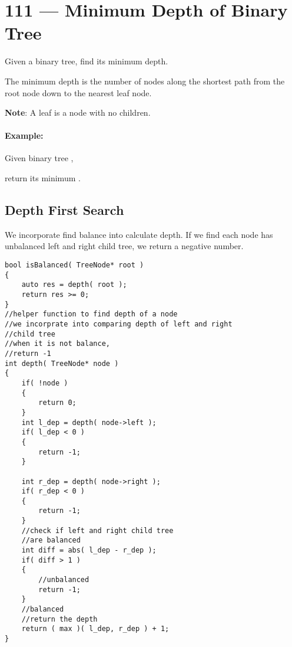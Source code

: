 \section{111 --- Minimum Depth of Binary Tree}
Given a binary tree, find its minimum depth.

The minimum depth is the number of nodes along the shortest path from the root node down to the nearest leaf node.

\textbf{Note}: A leaf is a node with no children.

\paragraph{Example:}
\begin{flushleft}

Given binary tree ,

\begin{figure}[H]

\begin{figure}[H]
\end{figure}

\end{figure}
return its minimum .
\end{flushleft}

\subsection{Depth First Search}
We incorporate find balance into calculate depth. If we find each node has unbalanced left and right child tree, we return a negative number.

\setcounter{lstlisting}{0}
\begin{lstlisting}[style=customc, caption={DFS}]
bool isBalanced( TreeNode* root )
{
    auto res = depth( root );
    return res >= 0;
}
//helper function to find depth of a node
//we incorprate into comparing depth of left and right
//child tree
//when it is not balance,
//return -1
int depth( TreeNode* node )
{
    if( !node )
    {
        return 0;
    }
    int l_dep = depth( node->left );
    if( l_dep < 0 )
    {
        return -1;
    }

    int r_dep = depth( node->right );
    if( r_dep < 0 )
    {
        return -1;
    }
    //check if left and right child tree
    //are balanced
    int diff = abs( l_dep - r_dep );
    if( diff > 1 )
    {
        //unbalanced
        return -1;
    }
    //balanced
    //return the depth
    return ( max )( l_dep, r_dep ) + 1;
}
\end{lstlisting}
